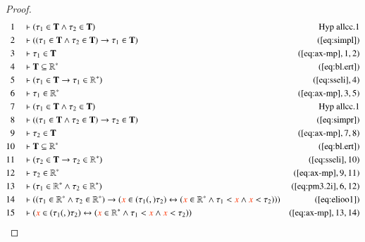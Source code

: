 \begin{proof}\label{proof:bl.allcc}
\begin{align}
  1 &&  & \vdash ( \tau_1 \in \mathbf{T} \wedge \tau_2 \in \mathbf{T}
      )&\text{Hyp~allcc.1}\notag%
  \\ 2 &&  & \vdash ( ( \tau_1 \in \mathbf{T} \wedge \tau_2 \in \mathbf{T} )
      \rightarrow \tau_1 \in \mathbf{T}
      )&(\mbox{\ref{eq:simpl}})\notag
  \\ 3 &&  & \vdash \tau_1 \in \mathbf{T}&(\mbox{\ref{eq:ax-mp}},1,2)\notag
  \\ 4 &&  & \vdash \mathbf{T} \subseteq
      \mathbb{R}^{\ast}&(\mbox{\ref{eq:bl.ert}})\notag
  \\ 5 &&  & \vdash ( \tau_1 \in \mathbf{T} \rightarrow \tau_1 \in
      \mathbb{R}^{\ast} )&(\mbox{\ref{eq:sseli}},4)\notag
  \\ 6 &&  & \vdash \tau_1 \in \mathbb{R}^{\ast}&(\mbox{\ref{eq:ax-mp}},3,5)\notag
  \\ 7 &&  & \vdash ( \tau_1 \in \mathbf{T} \wedge \tau_2 \in \mathbf{T}
      )&\text{Hyp~allcc.1}\notag%
  \\ 8 &&  & \vdash ( ( \tau_1 \in \mathbf{T} \wedge \tau_2 \in \mathbf{T} )
      \rightarrow \tau_2 \in \mathbf{T}
      )&(\mbox{\ref{eq:simpr}})\notag
  \\ 9 &&  & \vdash \tau_2 \in \mathbf{T}&(\mbox{\ref{eq:ax-mp}},7,8)\notag
  \\ 10 &&  & \vdash \mathbf{T} \subseteq
      \mathbb{R}^{\ast}&(\mbox{\ref{eq:bl.ert}})\notag
  \\ 11 &&  & \vdash ( \tau_2 \in \mathbf{T} \rightarrow \tau_2 \in
      \mathbb{R}^{\ast} )&(\mbox{\ref{eq:sseli}},10)\notag
  \\ 12 &&  & \vdash \tau_2 \in
      \mathbb{R}^{\ast}&(\mbox{\ref{eq:ax-mp}},9,11)\notag
  \\ 13 &&  & \vdash ( \tau_1 \in \mathbb{R}^{\ast} \wedge \tau_2 \in
      \mathbb{R}^{\ast} )&(\mbox{\ref{eq:pm3.2i}},6,12)\notag
  \\ 14 &&  & \vdash ( ( \tau_1 \in \mathbb{R}^{\ast} \wedge \tau_2 \in
      \mathbb{R}^{\ast} ) \rightarrow ( \msc{x} \in ( \tau_1
      (,) \tau_2 ) \leftrightarrow ( \msc{x} \in
      \mathbb{R}^{\ast} \wedge \tau_1 < \msc{x} \wedge \msc{x}
      < \tau_2 ) ) )&(\mbox{\ref{eq:elioo1}})\notag
  \\ 15 &&  & \vdash ( \msc{x} \in ( \tau_1 (,) \tau_2 ) \leftrightarrow (
      \msc{x} \in \mathbb{R}^{\ast} \wedge \tau_1 < \msc{x}
      \wedge \msc{x} < \tau_2 )
      )&(\mbox{\ref{eq:ax-mp}},13,14)\notag

\end{align}
\end{proof}
